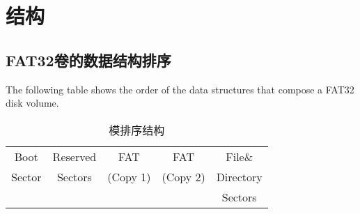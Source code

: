 \chapter{结构}

\section{FAT32卷的数据结构排序}
The following table shows the order of the
data structures that compose a FAT32 disk volume.




\begin{table}[htbp]
	\centering
	\caption[排序结构]{模排序结构}
	\begin{tabular}{ccccc}
	\hline
	Boot & Reserved & FAT & FAT & File\& \\
	Sector & Sectors & (Copy 1) & (Copy 2) & Directory \\
	& & & & Sectors \\
	\hline
	\end{tabular}
\end{table}

